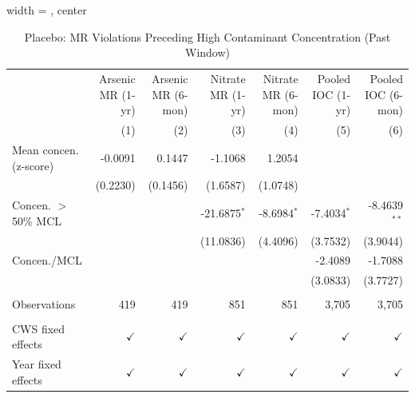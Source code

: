 
\begin{table}[htbp]
\caption{Placebo: MR Violations Preceding High Contaminant Concentration (Past Window)}\label{tab:mr_concentration_lag_placebo}
\centering
\begin{adjustbox}{width = \textwidth, center}
   \begin{tabular}{lrrrrrr}
      \toprule    
                                       & Arsenic MR (1-yr) & Arsenic MR (6-mon)   & Nitrate MR (1-yr) & Nitrate MR (6-mon)   & Pooled IOC (1-yr)  & Pooled IOC (6-mon) \\   
                                       & (1)               & (2)                  & (3)               & (4)                  & (5)                & (6)\\  
      \midrule 
      Mean concen. (z-score)                    & -0.0091           & 0.1447               & -1.1068           & 1.2054               &                    &   \\   
                                       & (0.2230)          & (0.1456)             & (1.6587)          & (1.0748)             &                    &   \\   
      Concen. $>$ 50\% MCL                        &                   &                      & -21.6875$^{*}$    & -8.6984$^{*}$        & -7.4034$^{*}$      & -8.4639$^{**}$\\   
                                       &                   &                      & (11.0836)         & (4.4096)             & (3.7532)           & (3.9044)\\   
      Concen./MCL                            &                   &                      &                   &                      & -2.4089            & -1.7088\\   
                                       &                   &                      &                   &                      & (3.0833)           & (3.7727)\\   
       \\
      Observations                     & 419               & 419                  & 851               & 851                  & 3,705              & 3,705\\  
       \\
      CWS fixed effects              & $\checkmark$      & $\checkmark$         & $\checkmark$      & $\checkmark$         & $\checkmark$       & $\checkmark$\\   
      Year fixed effects               & $\checkmark$      & $\checkmark$         & $\checkmark$      & $\checkmark$         & $\checkmark$       & $\checkmark$\\   

\end{tabular}
\end{adjustbox}
\end{table}
